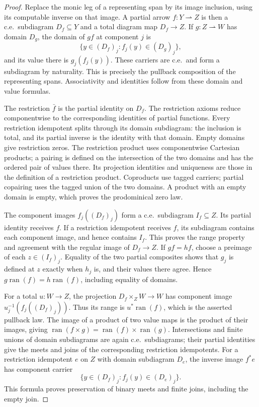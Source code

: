 \documentclass[11pt]{article}
\newcommand{\ran}{\operatorname{ran}}
\begin{document}
\begin{proof}
Replace the monic leg of a representing span by its image
inclusion, using its computable inverse on that image. A partial
arrow $f:Y\rightharpoonup Z$ is then a c.e.\ subdiagram
$D_f\subseteq Y$ and a total diagram map $D_f\to Z$.
If $g:Z\rightharpoonup W$ has domain $D_g$, the domain of $gf$
at component $j$ is
\[
 \{y\in(D_f)_j:f_j(y)\in(D_g)_j\},
\]
and its value there is $g_j(f_j(y))$. These carriers are c.e.\
and form a subdiagram by naturality. This is precisely the
pullback composition of the representing spans. Associativity
and identities follow from these domain and value formulas.

The restriction $\bar f$ is the partial identity on $D_f$.
The restriction axioms reduce componentwise to the corresponding
identities of partial functions. Every restriction idempotent
splits through its domain subdiagram: the inclusion is total,
and its partial inverse is the identity with that domain.
Empty domains give restriction zeros. The restriction product
uses componentwise Cartesian products; a pairing is defined on
the intersection of the two domains and has the ordered pair
of values there. Its projection identities and uniqueness are
those in the definition of a restriction product. Coproducts
use tagged carriers; partial copairing uses the tagged union
of the two domains. A product with an empty domain is empty,
which proves the prodominical zero law.

The component images $f_j((D_f)_j)$ form a c.e.\ subdiagram
$I_f\subseteq Z$. Its partial identity receives $f$. If a restriction
idempotent receives $f$, its subdiagram contains each component image,
and hence contains $I_f$.
This proves the range property and agreement with the regular
image of $D_f\to Z$. If $gf=hf$, choose a preimage of each
$z\in(I_f)_j$. Equality of the two partial composites shows
that $g_j$ is defined at $z$ exactly when $h_j$ is, and their
values there agree. Hence $g\ran(f)=h\ran(f)$, including
equality of domains.

For a total $u:W\to Z$, the projection
$D_f\times_Z W\to W$ has component image
$u_j^{-1}(f_j((D_f)_j))$. Thus its range is $u^*\ran(f)$,
which is the asserted pullback law. The image of a product
of two value maps is the product of their images, giving
$\ran(f\times g)=\ran(f)\times\ran(g)$.
Intersections and finite unions of domain subdiagrams are again
c.e.\ subdiagrams; their partial identities give the meets and joins
of the corresponding restriction idempotents. For a restriction idempotent
$e$ on $Z$ with domain subdiagram $D_e$, the inverse image $f^*e$
has component carrier
\[
 \{y\in(D_f)_j:f_j(y)\in(D_e)_j\}.
\]
This formula proves preservation of binary meets and finite joins,
including the empty join.


\end{proof}
\end{document}
